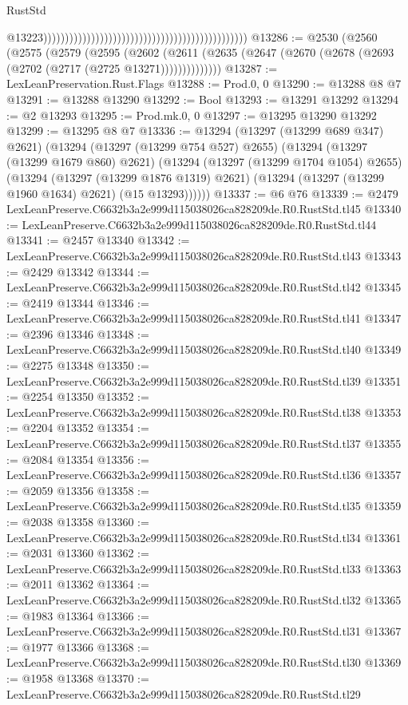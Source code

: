 \begin{lexlean}{RustStd}
\begin{coremodule}
                                                                                                  @13223)))))))))))))))))))))))))))))))))))))))))))))))
@13286 := @2530
    (@2560
      (@2575
        (@2579
          (@2595
            (@2602
              (@2611 (@2635 (@2647 (@2670 (@2678 (@2693 (@2702 (@2717 (@2725 @13271))))))))))))))
@13287 := LexLeanPreservation.Rust.Flags
@13288 := Prod.{0, 0}
@13290 := @13288 @8 @7
@13291 := @13288 @13290
@13292 := Bool
@13293 := @13291 @13292
@13294 := @2 @13293
@13295 := Prod.mk.{0, 0}
@13297 := @13295 @13290 @13292
@13299 := @13295 @8 @7
@13336 := @13294
    (@13297 (@13299 @689 @347) @2621)
    (@13294
      (@13297 (@13299 @754 @527) @2655)
      (@13294
        (@13297 (@13299 @1679 @860) @2621)
        (@13294
          (@13297 (@13299 @1704 @1054) @2655)
          (@13294
            (@13297 (@13299 @1876 @1319) @2621)
            (@13294 (@13297 (@13299 @1960 @1634) @2621) (@15 @13293))))))
@13337 := @6 @76
@13339 := @2479 LexLeanPreserve.C6632b3a2e999d115038026ca828209de.R0.RustStd.tl45
@13340 := LexLeanPreserve.C6632b3a2e999d115038026ca828209de.R0.RustStd.tl44
@13341 := @2457 @13340
@13342 := LexLeanPreserve.C6632b3a2e999d115038026ca828209de.R0.RustStd.tl43
@13343 := @2429 @13342
@13344 := LexLeanPreserve.C6632b3a2e999d115038026ca828209de.R0.RustStd.tl42
@13345 := @2419 @13344
@13346 := LexLeanPreserve.C6632b3a2e999d115038026ca828209de.R0.RustStd.tl41
@13347 := @2396 @13346
@13348 := LexLeanPreserve.C6632b3a2e999d115038026ca828209de.R0.RustStd.tl40
@13349 := @2275 @13348
@13350 := LexLeanPreserve.C6632b3a2e999d115038026ca828209de.R0.RustStd.tl39
@13351 := @2254 @13350
@13352 := LexLeanPreserve.C6632b3a2e999d115038026ca828209de.R0.RustStd.tl38
@13353 := @2204 @13352
@13354 := LexLeanPreserve.C6632b3a2e999d115038026ca828209de.R0.RustStd.tl37
@13355 := @2084 @13354
@13356 := LexLeanPreserve.C6632b3a2e999d115038026ca828209de.R0.RustStd.tl36
@13357 := @2059 @13356
@13358 := LexLeanPreserve.C6632b3a2e999d115038026ca828209de.R0.RustStd.tl35
@13359 := @2038 @13358
@13360 := LexLeanPreserve.C6632b3a2e999d115038026ca828209de.R0.RustStd.tl34
@13361 := @2031 @13360
@13362 := LexLeanPreserve.C6632b3a2e999d115038026ca828209de.R0.RustStd.tl33
@13363 := @2011 @13362
@13364 := LexLeanPreserve.C6632b3a2e999d115038026ca828209de.R0.RustStd.tl32
@13365 := @1983 @13364
@13366 := LexLeanPreserve.C6632b3a2e999d115038026ca828209de.R0.RustStd.tl31
@13367 := @1977 @13366
@13368 := LexLeanPreserve.C6632b3a2e999d115038026ca828209de.R0.RustStd.tl30
@13369 := @1958 @13368
@13370 := LexLeanPreserve.C6632b3a2e999d115038026ca828209de.R0.RustStd.tl29

\end{coremodule}
\end{lexlean}

